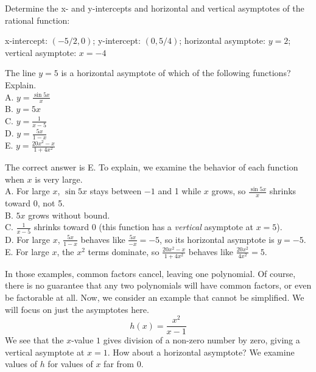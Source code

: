 \begin{Exercise}[title=Rational Functions Practice 1, label=ratfunc1]
  Determine the x- and y-intercepts and horizontal and vertical asymptotes of the rational function:
  \vspace{40mm}
\end{Exercise}
\begin{Answer}[ref=ratfunc1]
x-intercept: $(-5/2, 0)$; y-intercept: $(0, 5/4)$; horizontal asymptote: $y = 2$; vertical asymptote: $x = -4$
\end{Answer}

\begin{Exercise} The line $y = 5$ is a horizontal 
	asymptote of which of the following functions? Explain. \\
	A. $y = \frac{\sin{5x}}{x}$\\
	B. $y = 5x$\\
	C. $y = \frac{1}{x-5}$\\
	D. $y = \frac{5x}{1-x}$\\
	E. $y = \frac{20x^2 - x}{1 + 4x^2}$
\end{Exercise}

\begin{Answer}[ref=ratfunc2]
	The correct answer is E. To explain, we examine the behavior of each 
	function when $x$ is very large. \\
	A. For large $x$, $\sin 5x$ stays between $-1$ and 1 while $x$ grows,
	so $\frac{\sin 5x}{x}$ shrinks toward 0, not 5.\\
	B. $5x$ grows without bound.\\
	C. $\frac{1}{x-5}$ shrinks toward 0 (this function has a
	\textit{vertical} asymptote at $x = 5$).\\
	D. For large $x$, $\frac{5x}{1-x}$ behaves like $\frac{5x}{-x} = -5$,
	so its horizontal asymptote is $y = -5$.\\
	E. For large $x$, the $x^2$ terms dominate, so
	$\frac{20x^2 - x}{1 + 4x^2}$ behaves like $\frac{20x^2}{4x^2} = 5$. 
\end{Answer}

In those examples, common factors cancel, leaving one polynomial. Of course, there is no guarantee that any two polynomials will have common factors, or even be factorable at all. Now, we consider an example that cannot be simplified. We will focus on just the asymptotes here.
\[ h(x) = \frac{x^2}{x - 1} \]
We see that the \( x \)-value \( 1 \) gives division of a non-zero number by zero, giving a vertical asymptote at \( x = 1 \). How about a horizontal asymptote? We examine values of \( h \) for values of \( x \) far from \( 0 \).

